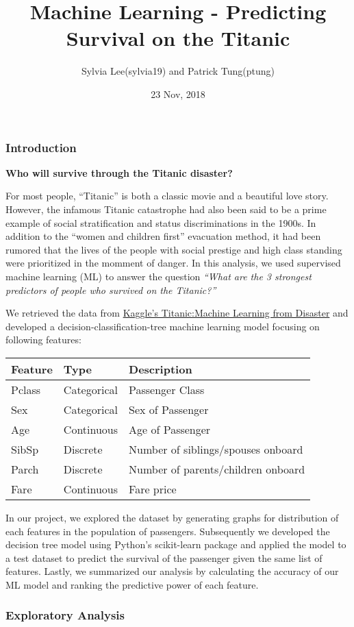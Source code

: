 \documentclass[]{article}
\title{Machine Learning - Predicting Survival on the Titanic}
\author{Sylvia Lee(sylvia19) and Patrick Tung(ptung)}
\date{23 Nov, 2018}
\begin{document}
\maketitle

\subsubsection{Introduction}\label{introduction}

\textbf{Who will survive through the Titanic disaster?}

For most people, ``Titanic'' is both a classic movie and a beautiful
love story. However, the infamous Titanic catastrophe had also been said
to be a prime example of social stratification and status
discriminations in the 1900s. In addition to the ``women and children
first'' evacuation method, it had been rumored that the lives of the
people with social prestige and high class standing were prioritized in
the momment of danger. In this analysis, we used supervised machine
learning (ML) to answer the question \emph{``What are the 3 strongest
predictors of people who survived on the Titanic?''}

We retrieved the data from
\href{https://www.kaggle.com/c/titanic}{Kaggle's Titanic:Machine
Learning from Disaster} and developed a decision-classification-tree
machine learning model focusing on following features:

\begin{longtable}[]{@{}lll@{}}
\toprule
Feature & Type & Description\tabularnewline
\midrule
\endhead
Pclass & Categorical & Passenger Class\tabularnewline
Sex & Categorical & Sex of Passenger\tabularnewline
Age & Continuous & Age of Passenger\tabularnewline
SibSp & Discrete & Number of siblings/spouses onboard\tabularnewline
Parch & Discrete & Number of parents/children onboard\tabularnewline
Fare & Continuous & Fare price\tabularnewline
\bottomrule
\end{longtable}

In our project, we explored the dataset by generating graphs for
distribution of each features in the population of passengers.
Subsequently we developed the decision tree model using Python's
scikit-learn package and applied the model to a test dataset to predict
the survival of the passenger given the same list of features. Lastly,
we summarized our analysis by calculating the accuracy of our ML model
and ranking the predictive power of each feature.

\subsubsection{Exploratory Analysis}\label{exploratory-analysis}
\end{document}
